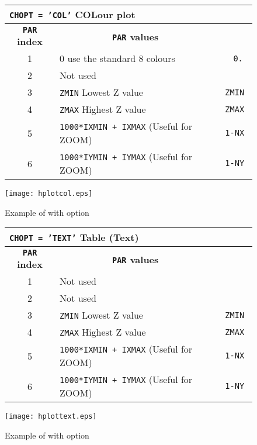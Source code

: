 \begin{figure}[p]
\begin{center}
\begin{tabular}{||c|p{11cm}|>{\tt}r||}
\hline
\multicolumn{3}{||l||}{\bf {\tt CHOPT = 'COL'} COLour plot}
\\
\hline
\multicolumn{1}{||c|}{\bf {\tt PAR} index}        &
\multicolumn{1}{c|}{\bf {\tt PAR} values}         &
\multicolumn{1}{c||}{\bf default}                \\
\hline
 1  & 0 use the standard 8 colours                                  &   0.    \\
 2  & Not used                                                      &         \\
 3  & {\tt ZMIN} Lowest Z value                                     &   ZMIN  \\
 4  & {\tt ZMAX} Highest Z value                                    &   ZMAX  \\
 5  & {\tt 1000*IXMIN + IXMAX} (Useful for ZOOM)                    &   1-NX  \\
 6  & {\tt 1000*IYMIN + IYMAX} (Useful for ZOOM)                    &   1-NY  \\
\hline
\end{tabular}
\end{center}
\bigskip
\begin{center} \texttt{[image: hplotcol.eps]} \end{center}
\caption{Example of \protect{} with \protect{} option}
\end{figure}

\begin{figure}[p]
\begin{center}
\begin{tabular}{||c|p{11cm}|>{\tt}r||}
\hline
\multicolumn{3}{||l||}{\bf {\tt CHOPT = 'TEXT'} Table (Text)}
\\
\hline
\multicolumn{1}{||c|}{\bf {\tt PAR} index}        &
\multicolumn{1}{c|}{\bf {\tt PAR} values}         &
\multicolumn{1}{c||}{\bf default}                \\
\hline
 1  & Not used                                                      &         \\
 2  & Not used                                                      &         \\
 3  & {\tt ZMIN} Lowest Z value                                     &   ZMIN  \\
 4  & {\tt ZMAX} Highest Z value                                    &   ZMAX  \\
 5  & {\tt 1000*IXMIN + IXMAX} (Useful for ZOOM)                    &   1-NX  \\
 6  & {\tt 1000*IYMIN + IYMAX} (Useful for ZOOM)                    &   1-NY  \\
\hline
\end{tabular}
\end{center}
\bigskip
\begin{center} \texttt{[image: hplottext.eps]} \end{center}
\caption{Example of \protect{} with \protect{} option}
\end{figure}

